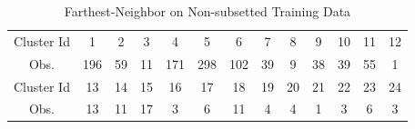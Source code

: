 \documentclass[12pt]{article}
\begin{document}
\begin{figure}[h]
\begin{center}
	\end{center}
\end{figure} 

\begin{table}[h]
\center
\caption{Farthest-Neighbor on Non-subsetted Training Data}
\begin{tabular}{c c c c c c c c c c c c c}
\hline
Cluster Id           & 1 & 2 & 3 & 4 & 5 & 6 & 7 & 8 & 9 & 10 & 11 & 12  \\
Obs. 		        	&196 & 59 & 11 & 171 & 298 & 102 & 39 & 9 & 38 & 39 & 55 & 1  \\
\hline
Cluster Id           & 13 & 14 & 15 & 16 & 17 & 18 & 19 & 20 & 21 & 22 & 23 & 24  \\
Obs.         		& 13 & 11 & 17 & 3 & 6 & 11 & 4 & 4 & 1 & 3 & 6 & 3  \\
\hline
\end{tabular}

\end{table}

\newpage
\end{document}
